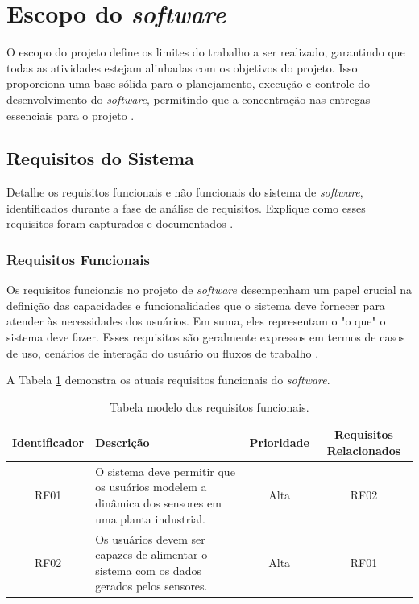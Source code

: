 \section{Escopo do \textit{software}}

O escopo do projeto define os limites do trabalho a ser realizado, garantindo que todas as atividades estejam alinhadas com os objetivos do projeto. Isso proporciona uma base sólida para o planejamento, execução e controle do desenvolvimento do \textit{software}, permitindo que a concentração nas entregas essenciais para o projeto \cite{softwareeng}.

\subsection{Requisitos do Sistema}

Detalhe os requisitos funcionais e não funcionais do sistema de \textit{software}, identificados durante a fase de análise de requisitos. Explique como esses requisitos foram capturados e documentados \cite{softwareengreq}.
    
\subsubsection{Requisitos Funcionais}

Os requisitos funcionais no projeto de \textit{software} desempenham um papel crucial na definição das capacidades e funcionalidades que o sistema deve fornecer para atender às necessidades dos usuários. Em suma, eles representam o "o que" o sistema deve fazer. Esses requisitos são geralmente expressos em termos de casos de uso, cenários de interação do usuário ou fluxos de trabalho \cite{softwareengreq}.
        
A Tabela \ref{tab:req_funcional} demonstra os atuais requisitos funcionais do \textit{software}.

\begin{table}[htbp]
\begin{tabularx}{\linewidth}{|c|X|c|c|} \hline
\textbf{Identificador} & 
\textbf{Descrição} & 
\textbf{Prioridade} &
\textbf{Requisitos Relacionados}\\ \hline
RF01 & 
O sistema deve permitir que os usuários modelem a dinâmica dos sensores em uma planta industrial. & 
Alta & 
RF02 \\ \hline
RF02 & 
Os usuários devem ser capazes de alimentar o sistema com os dados gerados pelos sensores. & 
Alta & 
RF01 \\ \hline
\end{tabularx}

\caption{Tabela modelo dos requisitos funcionais.}
\label{tab:req_funcional}
\end{table}
            
